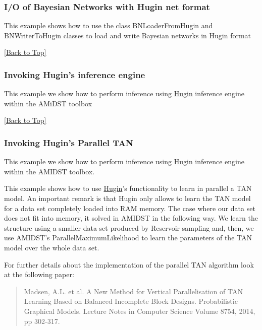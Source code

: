 \documentclass[10pt,a4paper]{article}
\begin{document}
\subsubsection{I/O of Bayesian Networks with Hugin net format}\label{sec:bns:huginlink:io}
This example shows how to use the class BNLoaderFromHugin and BNWriterToHugin classes to load and write Bayesian networks in Hugin format

\hyperref[sec:bns]{[Back to Top]}\newline 


\subsubsection{Invoking Hugin's inference engine}\label{sec:bns:huginlink:inference}
This example we show how to perform inference using \href{http://www.hugin.com}{Hugin} inference engine within the AMiDST toolbox

\hyperref[sec:bns]{[Back to Top]}\newline 



\subsubsection{Invoking Hugin's Parallel TAN}\label{sec:bns:huginlink:huginTAN}
This example we show how to perform inference using \href{http://www.hugin.com}{Hugin} inference engine within the AMIDST toolbox.\newline 

This example shows how to use \href{http://www.hugin.com}{Hugin}'s functionality to learn in parallel a TAN model. An important remark is that Hugin only allows to learn the TAN model for a data set completely loaded into RAM memory. The case where our data set does not fit into memory, it solved in AMIDST in the following way. We learn the structure using a smaller data set produced by Reservoir sampling and, then, we use AMIDST's ParallelMaximumLikelihood to learn the parameters of the TAN model over the whole data set.\newline 

For further details about the implementation of the parallel TAN algorithm look at the following paper:
\begin{quotation}
Madsen, A.L. et al. A New Method for Vertical Parallelisation of TAN Learning Based on Balanced Incomplete Block Designs. Probabilistic Graphical Models. Lecture Notes in Computer Science Volume 8754, 2014, pp 302-317.
\end{quotation}
\end{document}
